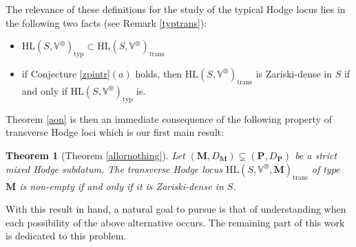 \documentclass[10pt]{article}
\numberwithin{equation}{subsection}
\theoremstyle{plain}
\newtheorem{theorem}{Theorem}[section]
\theoremstyle{definition}
\theoremstyle{remark}
\newcommand{\V}{\mathbb V}
\newcommand{\pp}{\mathbf P}
\newcommand{\M}{\mathbf M}
\newcommand{\HL}{\mathrm{HL}(S, \V^\otimes)}
\newcommand{\HLM}{\mathrm{HL}(S, \V^\otimes, \M)}
\newcommand{\typ}{\mathrm{typ}}
\newcommand{\trans}{\mathrm{trans}}
\begin{document}
The relevance of these definitions for the study of the typical Hodge locus lies in the following two facts (see Remark \ref{typtrans}):
\begin{itemize}
\item $\HL_\typ \subset \HL_\trans$
\item if Conjecture \ref{zpintr}$(a)$ holds, then $\HL_\trans$ is Zariski-dense in $S$ if and only if $\HL_\typ$ is.
\end{itemize}
Theorem \ref{aon} is then an immediate consequence of the following property of transverse Hodge loci which is our first main result:
\begin{theorem}[Theorem \ref{allornothing}]\label{aontrans}
Let $(\M, D_\M) \subsetneq (\pp, D_\pp)$ be a strict mixed Hodge subdatum. The transverse Hodge locus $\HLM_\trans$ of type $\M$ is non-empty if and only if it is Zariski-dense in $S$.
\end{theorem}
With this result in hand, a natural goal to pursue is that of understanding when each possibility of the above alternative occurs. The remaining part of this work is dedicated to this problem.
\end{document}
